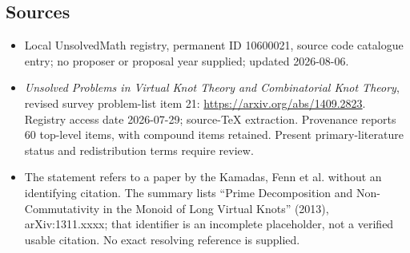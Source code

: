 \documentclass[11pt]{article}
\begin{document}
\subsection{Sources}
\begin{itemize}
\item Local UnsolvedMath registry, permanent ID 10600021, source code catalogue entry; no proposer or proposal year supplied; updated 2026-08-06.
\item \emph{Unsolved Problems in Virtual Knot Theory and Combinatorial Knot Theory}, revised survey problem-list item 21: \url{https://arxiv.org/abs/1409.2823}. Registry access date 2026-07-29; source-TeX extraction. Provenance reports 60 top-level items, with compound items retained. Present primary-literature status and redistribution terms require review.
\item The statement refers to a paper by the Kamadas, Fenn et al. without an identifying citation. The summary lists ``Prime Decomposition and Non-Commutativity in the Monoid of Long Virtual Knots'' (2013), arXiv:1311.xxxx; that identifier is an incomplete placeholder, not a verified usable citation. No exact resolving reference is supplied.
\end{itemize}
\end{document}
